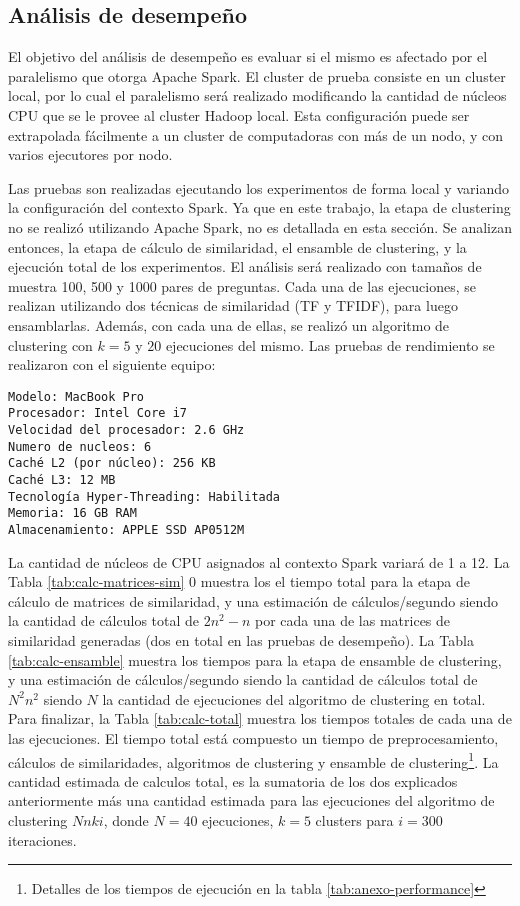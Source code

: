 \subsection{Análisis de desempeño}

El objetivo del análisis de desempeño es evaluar si el mismo es afectado por el paralelismo que otorga Apache Spark. El cluster de prueba consiste en un cluster local, por lo cual el paralelismo será realizado modificando la cantidad de núcleos CPU que se le provee al cluster Hadoop local. Esta configuración puede ser extrapolada fácilmente a un cluster de computadoras con más de un nodo, y con varios ejecutores por nodo.

\bigskip Las pruebas son realizadas ejecutando los experimentos de forma local y variando la configuración del contexto Spark. Ya que en este trabajo, la etapa de clustering no se realizó utilizando Apache Spark, no es detallada en esta sección. Se analizan entonces, la etapa de cálculo de similaridad, el ensamble de clustering, y la ejecución total de los experimentos. El análisis será realizado con tamaños de muestra 100, 500 y 1000 pares de preguntas. Cada una de las ejecuciones, se realizan utilizando dos técnicas de similaridad (TF y TFIDF), para luego ensamblarlas. Además, con cada una de ellas, se realizó un algoritmo de clustering con \(k = 5\) y \(20\) ejecuciones del mismo. Las pruebas de rendimiento se realizaron con el siguiente equipo:

\begin{verbatim}
Modelo: MacBook Pro
Procesador: Intel Core i7
Velocidad del procesador: 2.6 GHz
Numero de nucleos: 6
Caché L2 (por núcleo): 256 KB
Caché L3: 12 MB
Tecnología Hyper-Threading: Habilitada
Memoria: 16 GB RAM
Almacenamiento: APPLE SSD AP0512M
\end{verbatim}

\bigskip La cantidad de núcleos de CPU asignados al contexto Spark variará de 1 a 12. La Tabla \ref{tab:calc-matrices-sim} 0 muestra los el tiempo total para la etapa de cálculo de matrices de similaridad, y una estimación de cálculos/segundo siendo la cantidad de cálculos total de \(2n^2-n\) por cada una de las matrices de similaridad generadas (dos en total en las pruebas de desempeño). La Tabla \ref{tab:calc-ensamble} muestra los tiempos para la etapa de ensamble de clustering, y una estimación de cálculos/segundo siendo la cantidad de cálculos total de \(N^2n^2\) siendo \(N\) la cantidad de ejecuciones del algoritmo de clustering en total. Para finalizar, la Tabla \ref{tab:calc-total}  muestra los tiempos totales de cada una de las ejecuciones. El tiempo total está compuesto un tiempo de preprocesamiento, cálculos de similaridades, algoritmos de clustering y ensamble de clustering\footnote{Detalles de los tiempos de ejecución en la tabla \ref{tab:anexo-performance}}. La cantidad estimada de calculos total, es la sumatoria de los dos explicados anteriormente más una cantidad estimada para las ejecuciones del algoritmo de clustering \(Nnki\), donde \(N=40\) ejecuciones, \(k=5\) clusters para \(i=300\) iteraciones.

